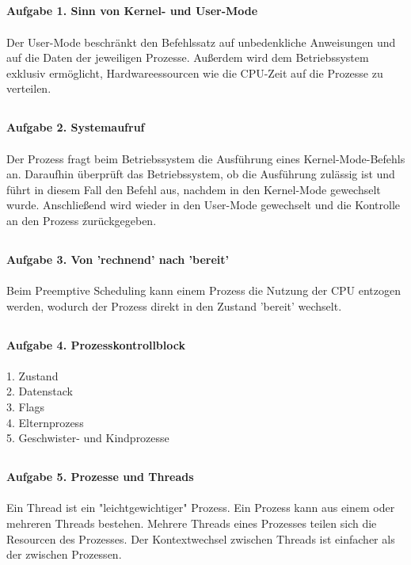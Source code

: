 \documentclass{article}
\begin{document}
\subsection*{}
\textbf {Aufgabe 1. Sinn von Kernel- und User-Mode} \\ \\
Der User-Mode beschränkt den Befehlssatz auf unbedenkliche Anweisungen und auf
die Daten der jeweiligen Prozesse. Außerdem wird dem Betriebssystem exklusiv
ermöglicht, Hardwareessourcen wie die CPU-Zeit auf die Prozesse zu verteilen.

\subsection*{}
\textbf {Aufgabe 2. Systemaufruf} \\ \\
Der Prozess fragt beim Betriebssystem die Ausführung eines Kernel-Mode-Befehls an.
Daraufhin überprüft das Betriebssystem, ob die Ausführung zulässig ist und führt
in diesem Fall den Befehl aus, nachdem in den Kernel-Mode gewechselt wurde.
Anschließend wird wieder in den User-Mode gewechselt und die Kontrolle an den
Prozess zurückgegeben.

\subsection*{}
\textbf {Aufgabe 3. Von 'rechnend' nach 'bereit'} \\ \\
Beim Preemptive Scheduling kann einem Prozess die Nutzung der CPU entzogen werden,
wodurch der Prozess direkt in den Zustand 'bereit' wechselt.

\subsection*{}
\textbf {Aufgabe 4. Prozesskontrollblock} \\ \\
1. Zustand \\
2. Datenstack \\
3. Flags \\
4. Elternprozess \\
5. Geschwister- und Kindprozesse \\

\subsection*{}
\textbf {Aufgabe 5. Prozesse und Threads} \\ \\
Ein Thread ist ein "leichtgewichtiger" Prozess. Ein Prozess kann aus einem oder
mehreren Threads bestehen. Mehrere Threads eines Prozesses teilen sich die
Resourcen des Prozesses. Der Kontextwechsel zwischen Threads ist einfacher als
der zwischen Prozessen.
\end{document}
